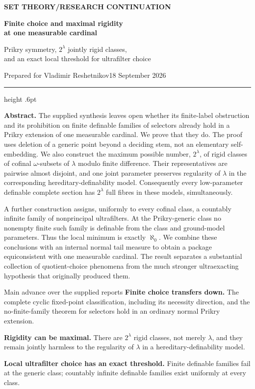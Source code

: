 \documentclass[11pt,letterpaper]{article}
\theoremstyle{definition}
\numberwithin{equation}{section}
\begin{document}
\thispagestyle{empty}
{\sffamily\bfseries\small\color{Olive}SET THEORY\quad /\quad RESEARCH CONTINUATION}

\vspace{13pt}
{\fontsize{28}{31}\selectfont\bfseries\color{Forest}Finite choice and maximal rigidity\\ at one measurable cardinal\par}
\vspace{10pt}
{\fontsize{14}{18}\selectfont Prikry symmetry, $2^\lambda$ jointly rigid classes,\\ and an exact local threshold for ultrafilter choice\par}
\vspace{14pt}
{\color{Muted}Prepared for Vladimir Reshetnikov\hfill 18 September 2026\par}
\vspace{3pt}
{\color{Sage}\hrule height .6pt}
\vspace{12pt}

\textbf{Abstract.}
The supplied synthesis leaves open whether its finite-label obstruction and its prohibition on finite definable families of selectors already hold in a Prikry extension of one measurable cardinal. We prove that they do. The proof uses deletion of a generic point beyond a deciding stem, not an elementary self-embedding. We also construct the maximum possible number, $2^\lambda$, of rigid classes of cofinal $\omega$-subsets of $\lambda$ modulo finite difference. Their representatives are pairwise almost disjoint, and one joint parameter preserves regularity of $\lambda$ in the corresponding hereditary-definability model. Consequently every low-parameter definable complete section has $2^\lambda$ full fibres in these models, simultaneously.

A further construction assigns, uniformly to every cofinal class, a countably infinite family of nonprincipal ultrafilters. At the Prikry-generic class no nonempty finite such family is definable from the class and ground-model parameters. Thus the local minimum is exactly $\aleph_0$. We combine these conclusions with an internal normal tail measure to obtain a package equiconsistent with one measurable cardinal. The result separates a substantial collection of quotient-choice phenomena from the much stronger ultraexacting hypothesis that originally produced them.

\begin{assessment}{Main advance over the supplied reports}
\textbf{Finite choice transfers down.} The complete cyclic fixed-point classification, including its necessity direction, and the no-finite-family theorem for selectors hold in an ordinary normal Prikry extension.

\textbf{Rigidity can be maximal.} There are $2^\lambda$ rigid classes, not merely $\lambda$, and they remain jointly harmless to the regularity of $\lambda$ in a hereditary-definability model.

\textbf{Local ultrafilter choice has an exact threshold.} Finite definable families fail at the generic class; countably infinite definable families exist uniformly at every class.
\end{assessment}
\end{document}
